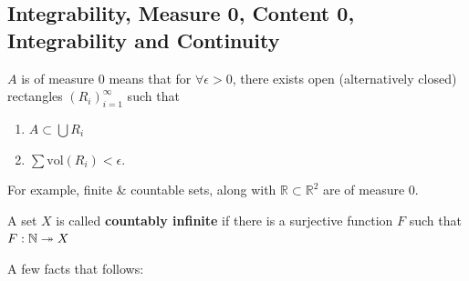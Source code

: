 \documentclass{article}
\begin{document}
\subsection{Integrability, Measure 0, Content 0, Integrability and Continuity}
\begin{definition}
    $A$ is of measure $0$ means that for $\forall \epsilon > 0$, there exists open (alternatively closed) rectangles $(R_i)_{i=1}^\infty$ such that
    \begin{enumerate}
        \item $A \subset \bigcup R_i$
        \item $\sum \text{vol}(R_i) < \epsilon.$
    \end{enumerate}
\end{definition}
For example, finite \& countable sets, along with $\mathbb{R} \subset \mathbb{R}^2$ are of measure $0$.
\begin{definition}
    A set $X$ is called \textbf{countably infinite} if there is a surjective function $F$ such that $F: \mathbb{N} \twoheadrightarrow X$
\end{definition}
A few facts that follows:
\end{document}
